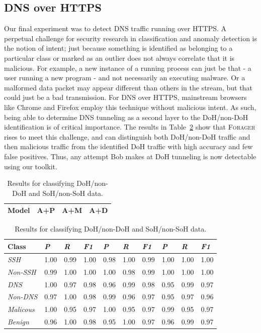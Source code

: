 \subsection{DNS over HTTPS}
Our final experiment was to detect DNS traffic running over HTTPS. A perpetual challenge for security research in classification and anomaly detection is the notion of intent; just because something is identified as belonging to a particular class or marked as an outlier does not always correlate that it is malicious. For example, a new instance of a running process can just be that - a user running a new program - and not necessarily an executing malware. Or a malformed data packet may appear different than others in the stream, but that could just be a bad transmission. For DNS over HTTPS, mainstream browsers like Chrome and Firefox employ this technique without malicious intent. As such, being able to determine DNS tunneling as a second layer to the DoH/non-DoH identification is of critical importance.
 The results in Table~\ref{tab:dohsohresults} show that \textsc{Forager} rises to meet this challenge, and can distinguish both DoH/non-DoH traffic and then malicious traffic from the identified DoH traffic with high accuracy and few false positives. Thus, any attempt Bob makes at DoH tunneling is now detectable using our toolkit.

\begin{table} [ht!]
\centering
\begin{tabular} {|p{2.5cm}|p{2.5cm}|p{2.5cm}|p{2.5cm}|}
\hline
\textbf{Model} & A+P & A+M & A+D \\
\hline
\end{tabular}
\begin{tabular} {|p{2cm}|p{0.6cm}p{0.6cm}p{0.6cm}|p{0.6cm}p{0.6cm}p{0.6cm}|p{0.6cm}p{0.6cm}p{0.6cm}|}
\hline
\textbf{Class} & \textit{P} & \textit{R} & \textit{F1} & \textit{P} & \textit{R} & \textit{F1} & \textit{P} & \textit{R} & \textit{F1} \\
\hline
\hline
\textit{SSH} & 1.00 & 0.99 & 1.00 & 0.98 & 1.00 & 0.99 & 1.00 & 1.00 & 1.00 \\
\textit{Non-SSH} & 0.99 & 1.00 & 1.00 & 1.00 & 0.98 & 0.99 & 1.00 & 1.00 & 1.00 \\
\hline
\hline
\textit{DNS} & 1.00 & 0.97 & 0.98 & 0.96 & 0.99 & 0.98 & 0.95 & 0.99 & 0.97 \\
\textit{Non-DNS} & 0.97 & 1.00 & 0.98 & 0.99 & 0.96 & 0.97 & 0.95 & 0.97 & 0.96 \\
\hline
\hline
\textit{Malicous} & 1.00 & 0.95 & 0.97 & 1.00 & 0.95 & 0.97 & 0.99 & 0.95 & 0.97 \\
\textit{Benign} & 0.96 & 1.00 & 0.98 & 0.95 & 1.00 & 0.97 & 0.96 & 0.99 & 0.97 \\
\hline
\end{tabular}
\caption{Results for classifying DoH/non-DoH and SoH/non-SoH data.}
\label{tab:dohsohresults}
\end{table}

